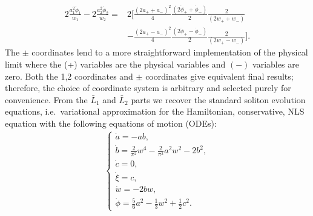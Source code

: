 \begin{align} 
2\frac{a_1^2  \dot{\phi}_1}{w_1} - 2\frac{a_2^2  \dot{\phi}_2}{w_2} =& 2\Bigg[  \frac{(2a_+ + a_-)^2}{4} \frac{(2\dot{\phi}_+ + \dot{\phi}_-)}{2} \frac{2}{(2w_+ + w_-)} \nonumber \\
&-  \frac{(2a_+ - a_-)^2}{4} \frac{(2\dot{\phi}_+ - \dot{\phi}_-)}{2} \frac{2}{(2w_+ - w_-)} \Bigg].\label{barLC}
\end{align}
The $\pm$ coordinates lend to a more straightforward implementation of the physical limit where the (+) variables are the physical variables and $(-)$ variables are zero.  Both the 1,2 coordinates and $\pm$ coordinates give equivalent final results; therefore, the choice of coordinate system is arbitrary and selected purely for convenience.     
From the $\bar{L}_1$ and $\bar{L}_2$ parts we recover the standard soliton evolution equations, i.e.~variational approximation for the Hamiltonian, conservative, NLS equation with the following equations of motion (ODEs):
{\begin{align} \begin{cases}
\dot{a} = - ab, \\
\dot{b} = \frac{2}{\pi^2} w^4 - \frac{2}{\pi^2} a^2 w^2 - 2b^2, \\
\dot{c} = 0,\\
\dot{\xi} = c, \\
\dot{w} = -2bw, \\
\dot{\phi} = \frac{5}{6} a^2 - \frac{1}{3} w^2 + \frac{1}{2} c^2.
\end{cases} \label{eq:CODEsNLS}\end{align} }
